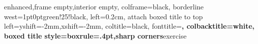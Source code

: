 
\usepackage{array}
\usepackage{tabularx}
\setlength {\marginparwidth }{2cm}
\usepackage{todonotes}
\usepackage{float}
\usepackage{tikz}
\usepackage{hyperref}


\usepackage[includehead]{geometry}
\usepackage{fancyhdr}


\def\checkmark{\tikz\fill[scale=0.4](0,.35) -- (.25,0) -- (1,.7) -- (.25,.15) -- cycle;} 

\def \ooad[#1]{
    {\tiny \textbf{(DUE P. #1)}}
}

\usepackage[most]{tcolorbox}
%
{ %
    enhanced,frame empty,interior empty,
    colframe=black,
    borderline west={1pt}{0pt}{green!25!black},
    left=0.2cm,
    attach boxed title to top left={yshift=-2mm,xshift=-2mm},
    coltitle=black,
    fonttitle=\bfseries,
    colbacktitle=white,
    boxed title style={boxrule=.4pt,sharp corners}}{exercise}